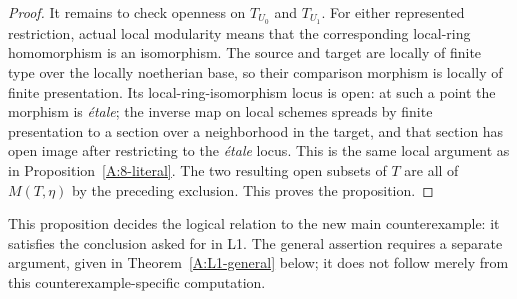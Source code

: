 \begin{proof}
It remains to check openness on $T_{U_0}$ and $T_{U_1}$.
For either represented restriction, actual local modularity means
that the corresponding local-ring homomorphism is an isomorphism.
The source and target are locally of finite type over the
locally noetherian base, so their comparison morphism is locally
of finite presentation.  Its local-ring-isomorphism locus is
open: at such a point the morphism is \emph{\'etale}; the inverse
map on local schemes spreads by finite presentation to a section
over a neighborhood in the target, and that section has open
image after restricting to the \emph{\'etale} locus.
This is the same local argument as in
Proposition~\ref{A:8-literal}.
The two resulting open subsets of $T$ are all of $M(T,\eta)$
by the preceding exclusion.  This proves the proposition.
\end{proof}

This proposition decides the logical relation to the new main
counterexample: it satisfies the conclusion asked for in L1.
The general assertion requires a separate argument, given in
Theorem~\ref{A:L1-general} below; it does not follow merely
from this counterexample-specific computation.
